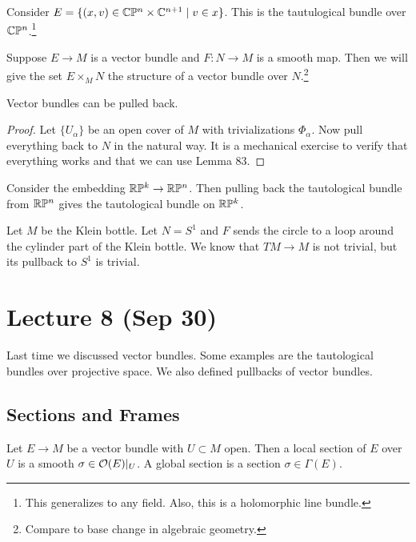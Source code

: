 \documentclass[twoside, 10pt]{article}
\begin{document}
    \begin{exm} Consider $E = \{(x,v) \in \mathbb{C}\mathbb{P}^n \times \mathbb{C}^{n+1} \mid v \in
    x\}$. This is the tautulogical bundle over $\mathbb{C}\mathbb{P}^n$.\footnote{This
    generalizes to any field. Also, this is a holomorphic line bundle.}
\end{exm}

    Suppose $E \to M$ is a vector bundle and $F:N \to M$ is a smooth map. Then
    we will give the set $E \times_M N$ the structure of a vector bundle over
    $N$.\footnote{Compare to base change in algebraic geometry.}

    \begin{thm} Vector bundles can be pulled back.  \end{thm}

    \begin{proof} Let $\{U_{\alpha}\}$ be an open cover of $M$ with
        trivializations $\Phi_{\alpha}$. Now pull everything back to $N$ in the
        natural way. It is a mechanical exercise to verify that everything
        works and that we can use Lemma 83.  \end{proof}

    \begin{exm} Consider the embedding $\mathbb{R}\mathbb{P}^k \to \mathbb{R}\mathbb{P}^n$. Then pulling back
    the tautological bundle from $\mathbb{R}\mathbb{P}^n$ gives the tautological bundle on
$\mathbb{R}\mathbb{P}^k$.  \end{exm}

    \begin{exm} Let $M$ be the Klein bottle. Let $N = S^1$ and $F$ sends the
    circle to a loop around the cylinder part of the Klein bottle. We know that
$TM \to M$ is not trivial, but its pullback to $S^1$ is trivial.  \end{exm}

    \section{Lecture 8 (Sep 30)}%
    
    Last time we discussed vector bundles. Some examples are the tautological
    bundles over projective space. We also defined pullbacks of vector bundles.

    \subsection{Sections and Frames}%
    
    Let $E \to M$ be a vector bundle with $U \subset M$ open. Then a local
    section of $E$ over $U$ is a smooth $\sigma \in \mathcal{O}(E)|_U$. A global
    section is a section $\sigma \in \Gamma(E)$.
\end{document}
